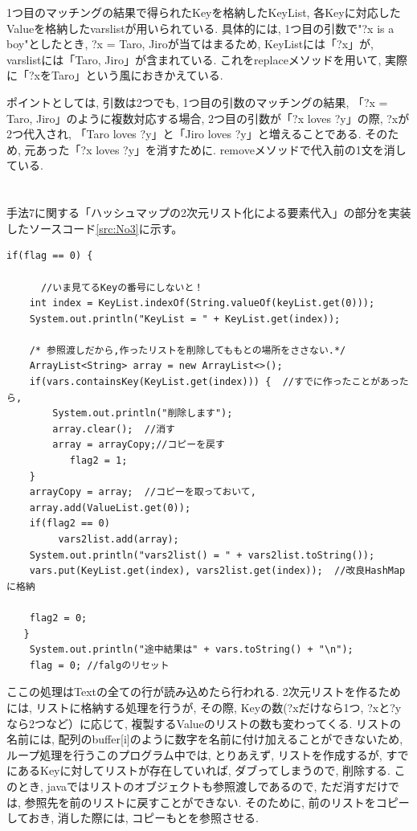 \documentclass[uplatex,12pt]{jsarticle}
\begin{document}
1つ目のマッチングの結果で得られたKeyを格納したKeyList, 各Keyに対応したValueを格納したvarslistが用いられている. 具体的には, 1つ目の引数で"?x is a boy"としたとき, ?x = Taro, Jiroが当てはまるため, KeyListには「?x」が, varslistには「Taro, Jiro」が含まれている. これをreplaceメソッドを用いて, 実際に「?xをTaro」という風におきかえている.

ポイントとしては, 引数は2つでも, 1つ目の引数のマッチングの結果, 「?x = Taro, Jiro」のように複数対応する場合, 2つ目の引数が「?x loves ?y」の際, ?xが2つ代入され, 「Taro loves ?y」と「Jiro loves ?y」と増えることである. そのため, 元あった「?x loves ?y」を消すために. removeメソッドで代入前の1文を消している.\\\\\\


手法7に関する「ハッシュマップの2次元リスト化による要素代入」の部分を実装したソースコード\ref{src:No3}に示す。
\begin{lstlisting}[caption=ハッシュマップの2次元リスト化,label=src:No3]
   if(flag == 0) {

      //いま見てるKeyの番号にしないと！
	int index = KeyList.indexOf(String.valueOf(keyList.get(0)));
	System.out.println("KeyList = " + KeyList.get(index));
	
	/* 参照渡しだから,作ったリストを削除してももとの場所をささない.*/
	ArrayList<String> array = new ArrayList<>();
	if(vars.containsKey(KeyList.get(index))) {	//すでに作ったことがあったら,
	    System.out.println("削除します");
	    array.clear();	//消す
	    array = arrayCopy;//コピーを戻す
		   flag2 = 1;
	}
	arrayCopy = array;	//コピーを取っておいて,
	array.add(ValueList.get(0));
	if(flag2 == 0)
	     vars2list.add(array);
	System.out.println("vars2list() = " + vars2list.toString());
	vars.put(KeyList.get(index), vars2list.get(index));  //改良HashMapに格納

	flag2 = 0;
   }
    System.out.println("途中結果は" + vars.toString() + "\n");
    flag = 0; //falgのリセット
\end{lstlisting}

ここの処理はTextの全ての行が読み込めたら行われる. 2次元リストを作るためには, リストに格納する処理を行うが, その際, Keyの数(?xだけなら1つ, ?xと?yなら2つなど）に応じて, 複製するValueのリストの数も変わってくる. リストの名前には, 配列のbuffer[i]のように数字を名前に付け加えることができないため, ループ処理を行うこのプログラム中では, とりあえず, リストを作成するが, すでにあるKeyに対してリストが存在していれば, ダブってしまうので, 削除する. このとき, javaではリストのオブジェクトも参照渡しであるので, ただ消すだけでは, 参照先を前のリストに戻すことができない. そのために, 前のリストをコピーしておき, 消した際には, コピーもとを参照させる.\\\\\\
\end{document}
